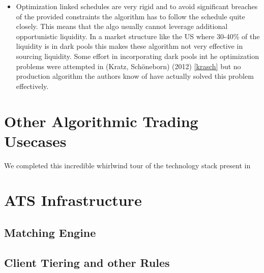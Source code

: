 \begin{itemize}
\item Optimization linked schedules are very rigid and to avoid significant breaches of the provided constraints the algorithm has to follow the schedule quite closely. This means that the algo usually cannot leverage additional opportunistic liquidity. In a market structure like the US where 30-40\% of the liquidity is in dark pools this makes these algorithm not very effective in sourcing liquidity. Some effort in incorporating dark pools int he optimization problems were attempted in (Kratz, Sch{\"o}neborn) (2012) \ref{krasch} but no production algorithm the authors know of have actually solved this problem effectively. 
\end{itemize}


\section{Other Algorithmic Trading Usecases}
We completed this incredible whirlwind tour of the technology stack present in 

\section{ATS Infrastructure}
\subsection{Matching Engine}
\subsection{Client Tiering and other Rules}

